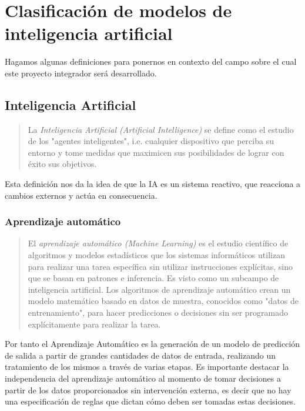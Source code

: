 \documentclass[a4paper,12pt]{article}
\begin{document}
\clearpage

\section{Clasificación de modelos de inteligencia artificial}

Hagamos algunas definiciones para ponernos en contexto del campo sobre el cual este proyecto integrador será desarrollado.

\subsection{Inteligencia Artificial}

\begin{quote}
	La \textit{Inteligencia Artificial (Artificial Intelligence)} se define como el estudio de los "agentes inteligentes", i.e. cualquier dispositivo que perciba su entorno y tome medidas que maximicen sus posibilidades de lograr con éxito sus objetivos.
		  
	\hfill \citet{poole1998}
\end{quote}

Esta definición nos da la idea de que la IA es un sistema reactivo, que reacciona a cambios externos y actúa en consecuencia.

\subsubsection{Aprendizaje automático} \label{machinelearning}

\begin{quote}
	El \textit{aprendizaje automático (Machine Learning)} es el estudio científico de algoritmos y modelos estadísticos que los sistemas informáticos utilizan para realizar una tarea específica sin utilizar instrucciones explícitas, sino que se basan en patrones e inferencia. Es visto como un subcampo de inteligencia artificial. Los algoritmos de aprendizaje automático crean un modelo matemático basado en datos de muestra, conocidos como "datos de entrenamiento", para hacer predicciones o decisiones sin ser programado explícitamente para realizar la tarea.
		  
	\hfill \citet{bishop2006pattern}
\end{quote}

Por tanto el Aprendizaje Automático es la generación de un modelo de predicción de salida a partir de grandes cantidades de datos de entrada, realizando un tratamiento de los mismos a través de varias etapas. Es importante destacar la independencia del aprendizaje automático al momento de tomar decisiones a partir de los datos proporcionados sin intervención externa, es decir que no hay una especificación de reglas que dictan cómo deben ser tomadas estas decisiones.
\end{document}

